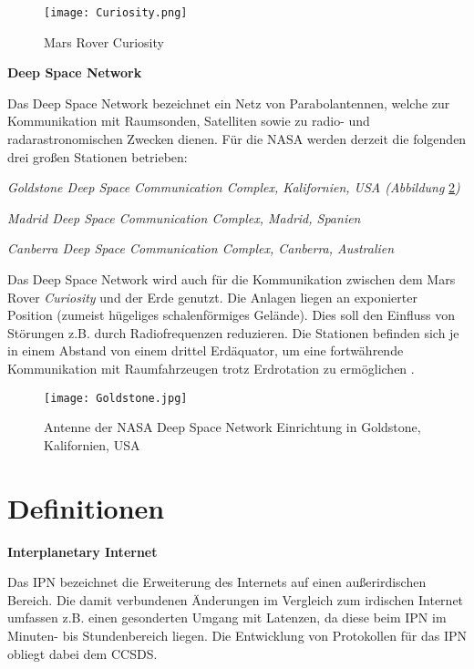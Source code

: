 \begin{figure}[H]
	\centering
	\texttt{[image: Curiosity.png]}
	\caption[Mars Rover Curiosity]{Mars Rover Curiosity \cite{imgCuriosity}}
	\label{fig:Curiosity}
\end{figure}

\textbf{Deep Space Network} \newline

Das Deep Space Network bezeichnet ein Netz von Parabolantennen, welche zur
Kommunikation mit Raumsonden, Satelliten sowie zu radio-
und radarastronomischen Zwecken dienen. F{\"u}r die NASA werden derzeit die
folgenden drei gro{\ss}en Stationen betrieben:

\begin{compactenum}[a)]
	\item \textit{Goldstone Deep Space Communication Complex, Kalifornien, USA
	(Abbildung} \ref{fig:Goldstone}\textit{)}
	\item \textit{Madrid Deep Space Communication Complex, Madrid, Spanien}
	\item \textit{Canberra Deep Space Communication Complex, Canberra, Australien}
\end{compactenum}

Das Deep Space Network wird auch f{\"u}r die Kommunikation zwischen dem Mars
Rover \textit{Curiosity} und der Erde genutzt. Die Anlagen liegen an exponierter Position
(zumeist h{\"u}geliges schalenf{\"o}rmiges Gel{\"a}nde). Dies soll den
Einfluss von St{\"o}rungen z.B. durch Radiofrequenzen reduzieren. Die Stationen
befinden sich je in einem Abstand von einem drittel Erd{\"a}quator, um eine
fortw{\"a}hrende Kommunikation mit Raumfahrzeugen trotz Erdrotation zu
erm{\"o}glichen \cite{web6}.

\begin{figure}[H]
	\centering
	\texttt{[image: Goldstone.jpg]}
	\caption[Antenne der NASA Deep Space Network Einrichtung in Goldstone, Kalifornien, USA]
	{Antenne der NASA Deep Space Network Einrichtung in Goldstone, Kalifornien, USA \cite{imgGoldstone}}
	\label{fig:Goldstone}
\end{figure}

\section{Definitionen}

\textbf{Interplanetary Internet}

Das \gls{IPN} bezeichnet die Erweiterung des Internets
auf einen au{\ss}erirdischen Bereich. Die damit verbundenen {\"A}nderungen im
Vergleich zum irdischen Internet umfassen z.B. einen gesonderten Umgang mit
Latenzen, da diese beim \gls{IPN} im Minuten- bis Stundenbereich liegen. Die
Entwicklung von Protokollen f{\"u}r das \gls{IPN} obliegt dabei dem \gls{CCSDS}.

